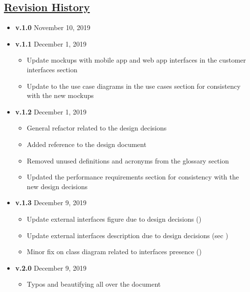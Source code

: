 \begin{appendices}
	\section[Revision History]{\hyperlink{toc}{Revision History}}
		\label{sec:revisionHistory}
		
		\begin{itemize}
			\item \textbf{v.1.0} November 10, 2019
			\item \textbf{v.1.1} December 1, 2019
				\begin{itemize}
					\item Update mockups with mobile app and web app interfaces in the customer interfaces section 
					\item Update to the use case diagrams in the use cases section  for consistency with the new mockups
				\end{itemize}
			\item \textbf{v.1.2} December 1, 2019
				\begin{itemize}
					\item General refactor related to the design decisions
					\item Added reference to the design document \cite{DD}
					\item Removed unused definitions and acronyms from the glossary section 
					\item Updated the performance requirements section  for consistency with the new design decisions
				\end{itemize}
			\item \textbf{v.1.3} December 9, 2019
				\begin{itemize}
					\item Update external interfaces figure due to design decisions ()
					\item Update external interfaces description due to design decisions (sec )
					\item Minor fix on class diagram related to interfaces presence ()
				\end{itemize}
			\item \textbf{v.2.0} December 9, 2019
				\begin{itemize}
					\item Typos and beautifying all over the document 
				\end{itemize}
		\end{itemize}
	

\end{appendices}
